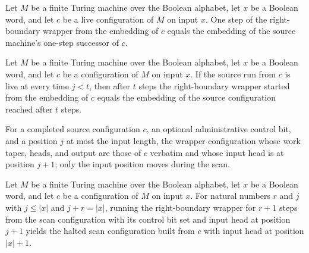 \begin{lemma}
\label{Turing.FinTM.emCall_right_step}
\leanok
{}
Let $M$ be a finite Turing machine over the Boolean alphabet, let $x$ be a Boolean word,
and let $c$ be a live configuration of $M$ on input $x$. One step of the right-boundary
wrapper from the embedding of $c$ equals the embedding of the source machine's one-step
successor of $c$.
\end{lemma}

\begin{lemma}
\label{Turing.FinTM.emCall_right_run}
\leanok
{}
Let $M$ be a finite Turing machine over the Boolean alphabet, let $x$ be a Boolean word,
and let $c$ be a configuration of $M$ on input $x$. If the source run from $c$ is live
at every time $j<t$, then after $t$ steps the right-boundary wrapper started from the
embedding of $c$ equals the embedding of the source configuration reached after $t$
steps.
\end{lemma}

\begin{definition}
\label{Turing.FinTM.emCallRightScan}
\leanok
{}
For a completed source configuration $c$, an optional administrative control bit, and a
position $j$ at most the input length, the wrapper configuration whose work tapes,
heads, and output are those of $c$ verbatim and whose input head is at position $j + 1$;
only the input position moves during the scan.
\end{definition}

\begin{lemma}
\label{Turing.FinTM.emCall_right_scan}
\leanok
{}
Let $M$ be a finite Turing machine over the Boolean alphabet, let $x$ be a Boolean word,
and let $c$ be a configuration of $M$ on input $x$. For natural numbers $r$ and $j$ with
$j\le |x|$ and $j+r=|x|$, running the right-boundary wrapper for $r+1$ steps from the
scan configuration with its control bit set and input head at position $j+1$ yields the
halted scan configuration built from $c$ with input head at position $|x|+1$.
\end{lemma}

